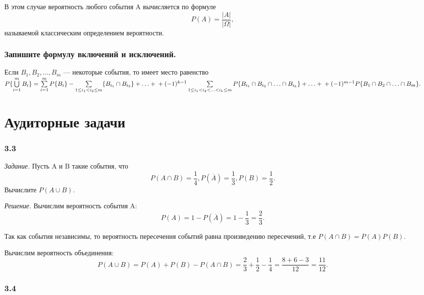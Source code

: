 \documentclass{book}
\begin{document}
В этом случае вероятность любого события A вычисляется по формуле
$$ P(A) =
\frac{ |A| }{ |\Omega| },$$
называемой классическим определением вероятности.

\subsubsection*{Запишите формулу включений и исключений.}

Если
$ B_1, B_2,  \dotsc , B_m $ --- некоторые события, то имеет место равенство
$ P\{ \bigcup \limits_{i=1}^m B_i \} =
\sum \limits_{i=1}^m P \{ B_i \} -
\sum \limits_{ 1 \leq i_1 < i_2 \leq m } \{ B_{ i_1 } \cap B_{ i_2 } \} + \dotsc + \\
+ (-1)^{k-1} \sum \limits_{ 1 \leq i_1 < i_2 < \dotsc < i_k \leq m } P \{ B_{ i_1 } \cap B_{ i_2 } \cap \dotsc \cap B_{ i_k } \} + \dotsc + \\
+ (-1)^{m-1} P \{ B_1 \cap B_2 \cap \dotsc \cap B_m \}.$

\section*{Аудиторные задачи}

\subsubsection*{3.3}

\textit{Задание.} Пусть A и B такие события, что
$$P \left( A \cap B \right) = \frac{1}{4},
P \left( \overline{A} \right) = \frac{1}{3},
P \left( B \right) = \frac{1}{2}. $$
Вычислите $P \left( A \cup B \right)$.

\textit{Решение.} Вычислим вероятность события A:
$$P \left( A \right) =
1 - P \left( \overline{A} \right) =
1 - \frac{1}{3} =
\frac{2}{3}.$$

Так как события независимы, то вероятность пересечения событий равна произведению пересечений, т.е
$P \left( A \cap B \right) = P \left( A \right) P \left( B \right) $.

Вычислим вероятность объединения:
$$P \left( A \cup B \right) =
P \left( A \right) + P \left( B \right) - P \left( A \cap B \right) =
\frac{2}{3} + \frac{1}{2} - \frac{1}{4} =
\frac{8+6-3}{12} =
\frac{11}{12}.$$

\subsubsection*{3.4}
\end{document}
